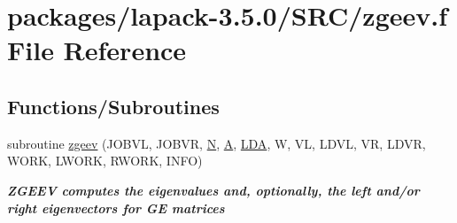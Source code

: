 \hypertarget{zgeev_8f}{}\section{packages/lapack-\/3.5.0/\+S\+R\+C/zgeev.f File Reference}
\label{zgeev_8f}
\subsection*{Functions/\+Subroutines}
\begin{DoxyCompactItemize}
\item 
subroutine \hyperlink{group__complex16GEeigen_ga0eb4e3d75621a1ce1685064db1ac58f0}{zgeev} (J\+O\+B\+V\+L, J\+O\+B\+V\+R, \hyperlink{polmisc_8c_a0240ac851181b84ac374872dc5434ee4}{N}, \hyperlink{classA}{A}, \hyperlink{example__user_8c_ae946da542ce0db94dced19b2ecefd1aa}{L\+D\+A}, W, V\+L, L\+D\+V\+L, V\+R, L\+D\+V\+R, W\+O\+R\+K, L\+W\+O\+R\+K, R\+W\+O\+R\+K, I\+N\+F\+O)
\begin{DoxyCompactList}\small\item\em {\bfseries  Z\+G\+E\+E\+V computes the eigenvalues and, optionally, the left and/or right eigenvectors for G\+E matrices} \end{DoxyCompactList}\end{DoxyCompactItemize}
